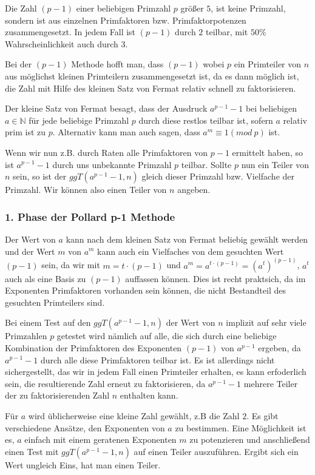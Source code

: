 \documentclass[10pt, bigheadings]{scrartcl}
\begin{document}
Die Zahl $(p-1)$ einer beliebigen Primzahl $p$ größer $5$, ist keine Primzahl, sondern
ist aus einzelnen Primfaktoren bzw. Primfaktorpotenzen zusammengesetzt.
In jedem Fall ist $(p-1)$ durch $2$ teilbar, mit $50\%$ Wahrscheinlichkeit auch durch $3$.

Bei der $(p-1)$ Methode hofft man, dass $(p-1)$ wobei $p$ ein Primteiler von  $n$
aus möglichst kleinen Primteilern zusammengesetzt ist, da es dann möglich ist, die
Zahl mit Hilfe des kleinen Satz von Fermat relativ schnell zu faktorisieren.

Der kleine Satz von Fermat besagt, dass der Ausdruck $a^{p-1} - 1$ bei beliebigen $a \in {\mathbb N}$
für jede beliebige Primzahl $p$ durch diese restlos teilbar ist, sofern $a$ relativ prim ist zu $p$.
Alternativ kann man auch sagen, dass $a^{m} \equiv 1(mod\ p)$ ist.

Wenn wir nun z.B. durch Raten alle Primfaktoren von $p-1$ ermittelt haben, so ist $a^{p-1} - 1$
durch uns unbekannte Primzahl $p$ teilbar.  Sollte $p$ nun ein Teiler von $n$ sein, so ist der
$ggT(a^{p-1} - 1, n)$ gleich dieser Primzahl bzw. Vielfache der Primzahl. Wir können also
einen Teiler von $n$ angeben.

\subsubsection*{1. Phase der Pollard p-1 Methode}
Der Wert von $a$ kann nach dem kleinen Satz von Fermat beliebig gewählt werden und der Wert
$m$ von $a^m$ kann auch ein Vielfaches von dem gesuchten Wert $(p-1)$ sein, da wir mit
$m = t \cdot (p-1)$ und $a^m = a^{t\cdot(p-1)} = (a^t)^{(p-1)}$, $a^t$ auch als eine Basis
zu $(p-1)$ auffassen können. Dies ist recht praktsich, da im Exponenten Primfaktoren vorhanden
sein können, die nicht Bestandteil des gesuchten Primteilers sind.

Bei einem Test auf den $ggT(a^{p-1} - 1, n)$ der Wert von $n$ implizit auf sehr viele Primzahlen
$p$ getestet wird nämlich auf alle, die sich durch eine beliebige Kombination der Primfaktoren
des Exponenten $(p-1)$ von $a^{p-1}$ ergeben, da $a^{p-1} - 1$ durch alle diese Primfaktoren teilbar
ist. Es ist allerdings nicht sichergestellt, das wir in jedem Fall einen Primteiler erhalten, es kann
erfoderlich sein, die resultierende Zahl erneut zu faktorisieren, da $a^{p-1} - 1$ mehrere Teiler der
zu faktorisierenden Zahl $n$ enthalten kann.

Für $a$ wird üblicherweise eine kleine Zahl gewählt, z.B die Zahl $2$. Es gibt verschiedene Ansätze, den
Exponenten von $a$ zu bestimmen. Eine Möglichkeit ist es, $a$ einfach mit einem geratenen Exponenten
$m$ zu potenzieren und anschließend einen Test mit $ggT(a^{p-1} - 1, n)$ auf einen Teiler auszuführen.
Ergibt sich ein Wert ungleich Eins, hat man einen Teiler.
\end{document}
